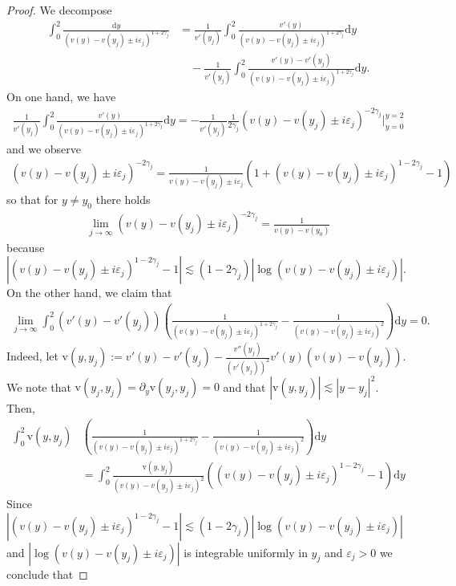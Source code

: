 \documentclass[11pt,reqno]{amsproc}
\theoremstyle{definition}
\numberwithin{equation}{section}
\renewcommand{\d}{\mathrm{d}}
\newcommand{\ep}{\varepsilon}
\begin{document}
\begin{proof}
We decompose
\begin{align*}
\int_0^2 \frac{\d y}{(v(y) - v(y_j) \pm i\ep_j)^{1+2\gamma_j}} &= \frac{1}{v'(y_j)}\int_0^2 \frac{v'(y)}{(v(y) - v(y_j) \pm i\ep_j)^{1+2\gamma_j}} \d y \\
&\quad- \frac{1}{v'(y_j)}\int_0^2 \frac{v'(y) - v'(y_j)}{(v(y) - v(y_j) \pm i\ep_j)^{1+2\gamma_j}} \d y.
\end{align*}
On one hand, we have
\begin{align*}
\frac{1}{v'(y_j)}\int_0^2 \frac{v'(y)}{(v(y) - v(y_j) \pm i\ep_j)^{1+2\gamma_j}} \d y = -\frac{1}{v'(y_j)}\frac{1}{2\gamma_j} (v(y) - v(y_j) \pm i\ep_j)^{-2\gamma_j}\Big|_{y=0}^{y=2}
\end{align*}
and we observe 
\begin{align*}
(v(y) -v(y_j) \pm i\ep_j)^{-2\gamma_j} = \frac{1}{v(y) - v(y_j) \pm i\ep_j}\left( 1 + (v(y) -v(y_j) \pm i\ep_j)^{1-2\gamma_j} -1 \right)
\end{align*}
so that for $y\neq y_0$ there holds 
\begin{align*}
\lim_{j\rightarrow \infty} (v(y) -v(y_j) \pm i\ep_j)^{-2\gamma_j} = \frac{1}{v(y) - v(y_0)}
\end{align*}
because $\left|  (v(y) -v(y_j) \pm i\ep_j)^{1-2\gamma_j} -1  \right| \lesssim (1-2\gamma_j) \left| \log( v(y) - v(y_j) \pm i\ep_j) \right|$. On the other hand, we claim that
\begin{align*}
\lim_{j\rightarrow \infty}\int_0^2 \left( v'(y) - v'(y_j) \right) \left( \frac{1}{(v(y) - v(y_j) \pm i\ep_j)^{1+2\gamma_j}} - \frac{1}{(v(y) - v(y_j) \pm i\ep_j)^2} \right) \d y =0.
\end{align*}
Indeed, let $\mathrm{v}(y,y_j):= v'(y) - v'(y_j) - \frac{v''(y_j)}{(v'(y_j))^2}v'(y)(v(y) - v(y_j))$. We note that $\mathrm{v}(y_j,y_j) = \partial_y \mathrm{v}(y_j,y_j) = 0$ and that $| \mathrm{v}(y,y_j) | \lesssim |y-y_j|^2$. Then,
\begin{align*}
\int_0^2 \mathrm{v}(y,y_j)& \left( \frac{1}{(v(y) - v(y_j) \pm i\ep_j)^{1+2\gamma_j}} - \frac{1}{(v(y) - v(y_j) \pm i\ep_j)^2} \right) \d y \\
&= \int_0^2 \frac{\mathrm{v}(y,y_j)}{(v(y) - v(y_j) \pm i\ep_j)^2} \left( (v(y) - v(y_j) \pm i\ep_j)^{1-2\gamma_j} -1 \right) \d y
\end{align*}
Since $\left|  (v(y) -v(y_j) \pm i\ep_j)^{1-2\gamma_j} -1  \right| \lesssim (1-2\gamma_j) \left| \log( v(y) - v(y_j) \pm i\ep_j) \right|$ and $\left| \log( v(y) - v(y_j) \pm i\ep_j) \right|$ is integrable uniformly in $y_j$ and $\ep_j>0$ we conclude that 

\end{proof}
\end{document}
